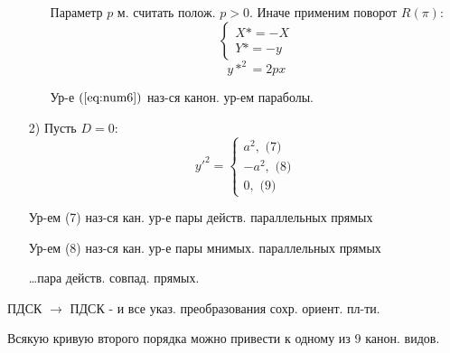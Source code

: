 \begin{itemize}
\begin{itemize}
\[        \]
        \begin{note}
        Параметр $p$ м. считать полож. $p > 0$. Иначе применим поворот $R(\pi)$:
        \[
          \begin{cases}
        X* = -X \\
        Y* = -y
          \end{cases}
        \]
        \begin{equation}
          \label{eq:num6}
        y*^{2} = 2px 
        \end{equation}
        \end{note}
        \begin{definition}
        Ур-е $(\ref{eq:num6})$ наз-ся канон. ур-ем параболы.
        \end{definition}
    \end{itemize}
  \item [2) ] Пусть $D = 0$:
    \[
    y'^{2} = \begin{cases}
      a^{2}, \text{ (7)} \\
      -a^{2}, \text{ (8)} \\
      0, \text{ (9)}
    \end{cases}
    \]
    \begin{definition}
    Ур-ем (7) наз-ся кан. ур-е пары действ. параллельных прямых
    \end{definition}
    \begin{definition}
    Ур-ем (8) наз-ся кан. ур-е пары мнимых. параллельных прямых
    \end{definition}
    \begin{definition}
    \ldots пара действ. совпад. прямых.
    \end{definition}
\end{itemize}
\begin{note}
ПДСК $ \rightarrow $ ПДСК - и все указ. преобразования сохр. ориент. пл-ти.
\end{note}
\begin{theorem}
Всякую кривую второго порядка можно привести к одному из 9 канон. видов.
\end{theorem}
